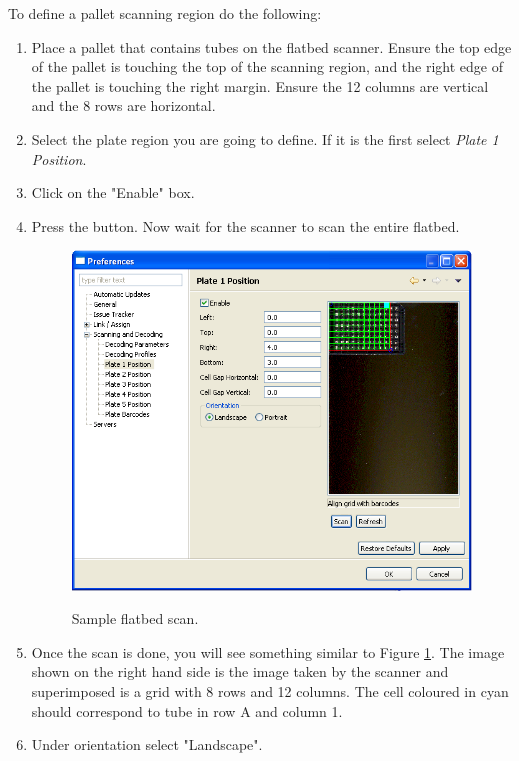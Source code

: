 To define a pallet scanning region do the following:
\begin{enumerate}
  \item Place a pallet that contains tubes on the flatbed scanner. Ensure the
    top edge of the pallet is touching the top of the scanning region, and the right
    edge of the pallet is touching the right margin. Ensure the 12 columns
    are vertical and the 8 rows are horizontal.
  \item Select the plate region you are going to define.  If it is the first
    select \emph{Plate 1 Position}.
  \item Click on the "Enable" box.
  \item Press the  button. Now wait for the scanner to scan the entire
    flatbed.
    \begin{figure}[H]
      \centering
      \scalebox{0.5}
      { \includegraphics*{screenshots/configuration/sample_flatbed_scan} }
      \caption{Sample flatbed scan.}
      \label{fig:sample_flatbed_scan}
    \end{figure}
  \item Once the scan is done, you will see something similar to Figure
    \ref{fig:sample_flatbed_scan}. The image shown on the right hand side is
    the image taken by the scanner and superimposed is a grid with 8 rows and
    12 columns. The cell coloured in cyan should correspond to tube in row A and
    column 1.
  \item Under orientation select "Landscape".

\end{enumerate}
